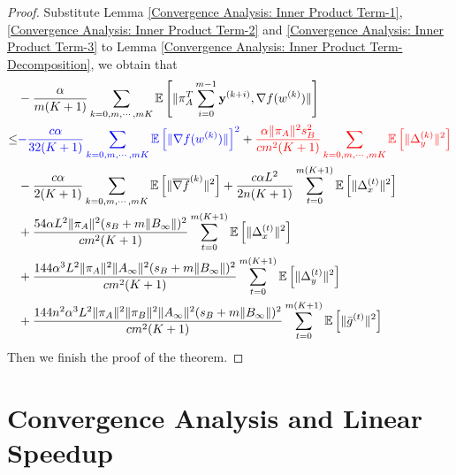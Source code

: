\documentclass{article}
\newcommand{\vy}{{\mathbf{y}}}
\newcommand{\EE}[1]{\mathbb{E}\left[#1\right]}
\newcommand{\norm}[1]{\| #1 \|}
\begin{document}
\begin{proof}
  Substitute Lemma \ref{Convergence Analysis: Inner Product Term-1}, \ref{Convergence Analysis: Inner Product Term-2} and \ref{Convergence Analysis: Inner Product Term-3} to Lemma \ref{Convergence Analysis: Inner Product Term-Decomposition}, we obtain that
  \begin{align*}
    &-\frac{\alpha}{m(K+1)}\sum_{k=0,m,\cdots,mK}\EE{\norm{\pi_A^T\sum_{i=0}^{m-1}\vy^{(k+i)},\nabla f(w^{(k)}) }}\\
    \leq& \textcolor{blue}{-\frac{c\alpha}{32(K+1)}\sum_{k=0,m,\cdots,mK}\EE{\norm{\nabla f(w^{(k)})}}^2}+\textcolor{red}{\frac{\alpha\norm{\pi_A}^2s_B^2}{cm^2(K+1)}\sum_{k=0,m,\cdots,mK}\EE{\norm{\Delta_y^{(k)}}^2}}\\&-\frac{c\alpha }{2(K+1)}\sum_{k=0,m,\cdots,mK}\EE{\norm{\overline{\nabla f}^{(k)}}^2}+\frac{c\alpha L^2}{2n(K+1)}\sum_{t=0}^{m(K+1)}\EE{\norm{\Delta_x^{(t)}}^2}\\&+\frac{54\alpha L^2\norm{\pi_A}^2(s_B+m\norm{B_{\infty}})^2}{cm^2(K+1)}\sum_{t=0}^{m(K+1)}\EE{\norm{\Delta_x^{(t)}}^2}\\&+\frac{144\alpha^3L^2\norm{\pi_A}^2\norm{A_{\infty}}^2(s_B+m\norm{B_{\infty}})^2}{cm^2(K+1)}\sum_{t=0}^{m(K+1)}\EE{\norm{\Delta_y^{(t)}}^2}
    \\&+\frac{144n^2\alpha^3L^2\norm{\pi_A}^2\norm{\pi_B}^2\norm{A_{\infty}}^2(s_B+m\norm{B_{\infty}})^2}{cm^2(K+1)}\sum_{t=0}^{m(K+1)}\EE{\norm{\bar{g}^{(t)}}^2}
  \end{align*}
  Then we finish the proof of the theorem.
\end{proof}

\section{Convergence Analysis and Linear Speedup}
\end{document}
